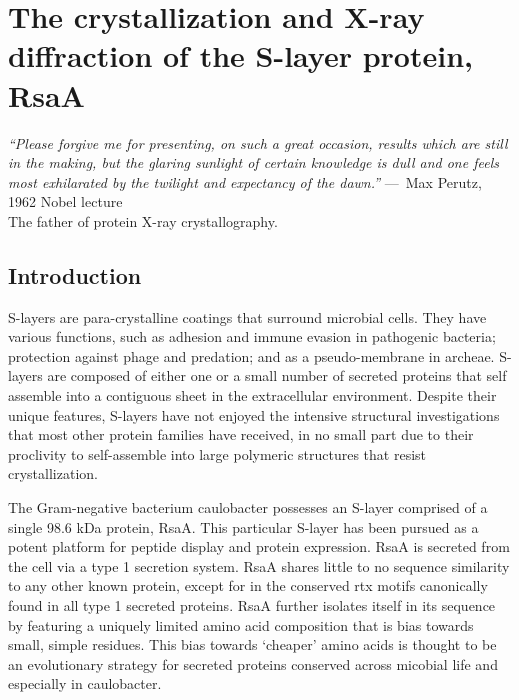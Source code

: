 \acresetall

\chapter{The crystallization and X-ray diffraction of the S-layer protein, RsaA}
\label{ch:crystal}
\begin{epigraph}
  \emph{``Please forgive me for presenting, on such a great occasion, results which are still in the making, but the glaring sunlight of certain knowledge is dull and one feels most exhilarated by the twilight and expectancy of the dawn.''} ---~Max Perutz, 1962 Nobel lecture\\ The father of protein X-ray crystallography.
\end{epigraph}

\section{Introduction} %
\label{sec:crystal_introduction} 

\Acp{S-layer} are para-crystalline coatings that
surround microbial cells. %
 They have various functions, such as adhesion
and immune evasion in pathogenic bacteria; %
 protection against phage and predation; %
 and as a pseudo-membrane in archeae. %
 \acp{S-layer} are composed of either one or a small number of secreted proteins that self assemble
into a contiguous sheet in the extracellular environment. Despite their
unique features, \acp{S-layer} have not enjoyed the intensive structural
investigations that most other protein families have received, in no
small part due to their proclivity to self-assemble into large polymeric
structures that resist crystallization.

The Gram-negative bacterium \ac{caulobacter} possesses an
S-layer comprised of a single 98.6 kDa protein, RsaA. %
 This particular S-layer has been pursued as a potent platform for peptide display and
protein expression. %
RsaA is secreted from the cell via a type 1
secretion system. %
 RsaA shares little to no sequence similarity to any
other known protein, except for in the conserved \ac{rtx}
motifs canonically found in all type 1 secreted proteins. %
 RsaA further isolates itself in its sequence by featuring a uniquely limited amino
acid composition that is bias towards small, simple residues. This bias
towards `cheaper' amino acids is thought to be an evolutionary strategy
for secreted proteins conserved across micobial life and especially in
\ac{caulobacter}. %

